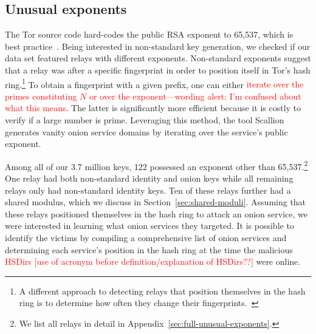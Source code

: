 \subsection{Unusual exponents}
\label{sec:unusual-exponents}
The Tor source code hard-codes the public RSA exponent to 65,537, which is best
practice~\cite[\S~4]{Boneh1999a}.  Being interested in non-standard key
generation, we checked if our data set featured relays with different
exponents.  Non-standard exponents suggest that a relay was after a specific
fingerprint in order to position itself in Tor's hash ring.\footnote{A different
approach to detecting relays that position themselves in the hash ring is to
determine how often they change their fingerprints.~\cite[\S~4.3.3]{Winter2016a}}
To obtain a fingerprint with a given prefix, one can either \textcolor{red}{iterate over the
primes constituting $N$ or over the exponent---wording alert: I'm confused about what this means}.  
The latter is significantly more
efficient because it is costly to verify if a large number is prime.  Leveraging
this method, the tool Scallion~\cite{scallion} generates vanity onion service
domains by iterating over the service's public exponent.

Among all of our 3.7 million keys, 122 possessed an exponent other than
65,537.\footnote{We list all relays in detail in
Appendix~\ref{sec:full-unusual-exponents}.} One relay had both 
non-standard identity and onion keys while all remaining relays only had
non-standard identity keys.  Ten of these relays further had a shared modulus,
which we discuss in Section~\ref{sec:shared-moduli}.  Assuming that these relays
positioned themselves in the hash ring to attack an onion service, we were
interested in learning what onion services they targeted.  It is possible to
identify the victims by compiling a comprehensive list of onion services and
determining each service's position in the hash ring at the time the malicious
 \textcolor{red}{HSDirs [use of acronym before definition/explanation of HSDirs??]} were online.  

